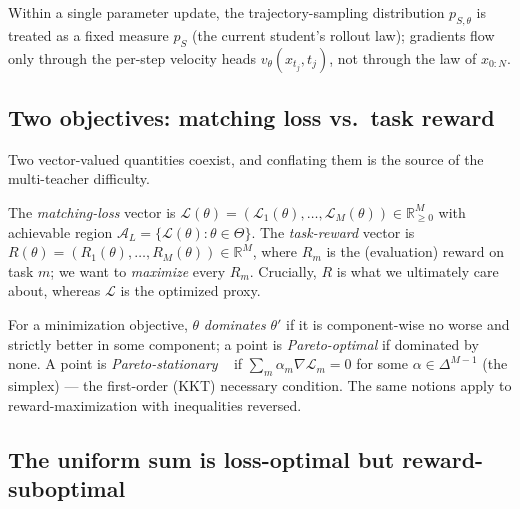 \begin{assumption}
\label{as:frozen}
Within a single parameter update, the trajectory-sampling distribution $p_{S,\theta}$
is treated as a fixed measure $p_S$ (the current student's rollout law); gradients flow
only through the per-step velocity heads $v_\theta(x_{t_j},t_j)$, not through the law of
$x_{0:N}$.
\end{assumption}

\subsection{Two objectives: matching loss vs.\ task reward}
\label{sec:th-moo}

Two vector-valued quantities coexist, and conflating them is the source of the
multi-teacher difficulty.

\begin{definition}
\label{def:objs}
The \emph{matching-loss} vector is
$\mathcal L(\theta)=(\mathcal L_1(\theta),\dots,\mathcal L_M(\theta))\in\mathbb R_{\ge0}^M$
with achievable region $\mathcal A_L=\{\mathcal L(\theta):\theta\in\Theta\}$. The
\emph{task-reward} vector is $R(\theta)=(R_1(\theta),\dots,R_M(\theta))\in\mathbb R^M$,
where $R_m$ is the (evaluation) reward on task $m$; we want to \emph{maximize} every
$R_m$. Crucially, $R$ is what we ultimately care about, whereas $\mathcal L$ is the
optimized proxy.
\end{definition}

\begin{definition}
\label{def:pareto}
For a minimization objective, $\theta$ \emph{dominates} $\theta'$ if it is
component-wise no worse and strictly better in some component; a point is
\emph{Pareto-optimal} if dominated by none. A point is \emph{Pareto-stationary}%
~\cite{desideri2012mgda,sener2018multi} if $\sum_m\alpha_m\nabla\mathcal L_m=0$ for some
$\alpha\in\Delta^{M-1}$ (the simplex) --- the first-order (KKT) necessary condition. The
same notions apply to reward-maximization with inequalities reversed.
\end{definition}

\subsection{The uniform sum is loss-optimal but reward-suboptimal}
\label{sec:th-reward}

